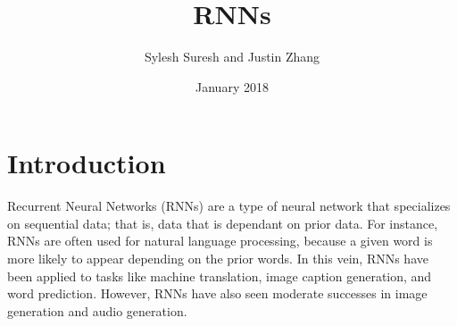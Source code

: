 \documentclass{article}
\title{RNNs}
\author{Sylesh Suresh and Justin Zhang}
\date{January 2018}
\begin{document}
\maketitle

\section{Introduction}
Recurrent Neural Networks (RNNs) are a type of neural network that specializes on sequential data; that is, data that is dependant on prior data. For instance, RNNs are often used for natural language processing, because a given word is more likely to appear depending on the prior words. In this vein, RNNs have been applied to tasks like machine translation, image caption generation, and word prediction. However, RNNs have also seen moderate successes in image generation and audio generation.
\end{document}
